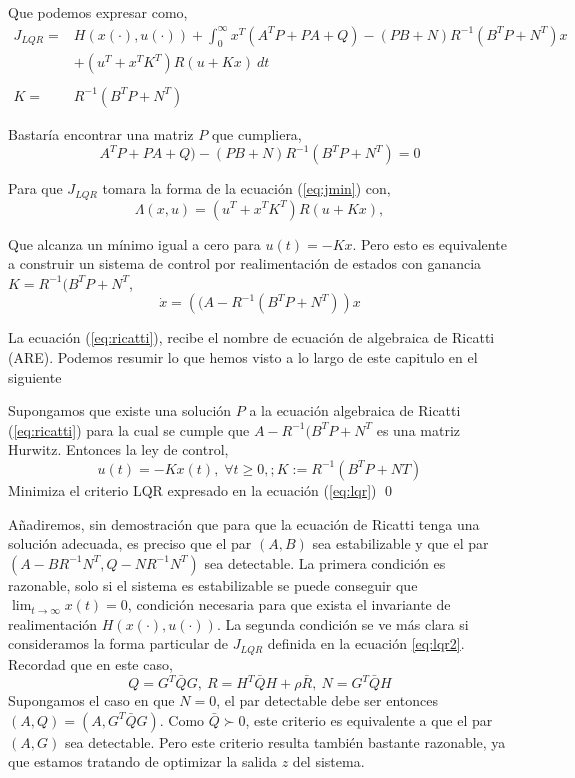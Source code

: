 Que podemos expresar como,
\begin{equation}
\begin{split}
J_{LQR}=&H\left(x(\cdot),u(\cdot)\right) + \int_0^{\infty}x^T(A^TP+PA+Q)-(PB+N)R^{-1}(B^TP+N^T)x\\
&+(u^T+x^TK^T)R(u+Kx)\ dt\\
\ \\
K =& R^{-1}(B^TP+N^T)
\end{split}
\end{equation}

Bastaría encontrar una matriz $P$ que cumpliera,
\begin{equation}\label{eq:ricatti}
A^TP+PA+Q)-(PB+N)R^{-1}(B^TP+N^T) = 0
\end{equation}

Para que $J_{LQR}$ tomara la forma de la ecuación (\ref{eq:jmin}) con,
\begin{equation*}
\Lambda(x,u) = (u^T+x^TK^T)R(u+Kx),
\end{equation*} 

Que alcanza un mínimo igual a cero para $u(t) = -Kx$.  Pero esto es equivalente a construir un sistema de control por realimentación de estados con ganancia $K = R^{-1}(B^TP+N^T$,
\begin{equation}
\dot x = \left((A-R^{-1}(B^TP+N^T)\right)x
\end{equation}

La ecuación (\ref{eq:ricatti}), recibe el nombre de ecuación de algebraica de Ricatti (ARE). Podemos resumir lo que hemos visto a lo largo de este capitulo en el siguiente 

\begin{theorem}
Supongamos que existe una solución $P$ a la ecuación algebraica de Ricatti (\ref{eq:ricatti}) para la cual se cumple que $A-R^{-1}(B^TP+N^T$ es una matriz Hurwitz. Entonces la ley de control,
\begin{equation*}
u(t) = -Kx(t),\; \forall t \geq 0,; K:=R^{-1}(B^TP+NT)
\end{equation*}
Minimiza el criterio LQR expresado en la ecuación (\ref{eq:lqr})
\qed
\end{theorem}

Añadiremos, sin demostración que para que la ecuación de Ricatti tenga una solución adecuada, es preciso que el par $(A,B)$ sea estabilizable y que el par $(A-BR^{-1}N^T,Q-NR^{-1}N^T)$ sea detectable. La primera condición es razonable, solo si el sistema es estabilizable se puede conseguir que $\lim_{t\rightarrow \infty} x(t)= 0$, condición necesaria para que exista el invariante de realimentación $H(x(\cdot),u(\cdot))$.  La segunda condición se ve más clara si consideramos la forma particular de $J_{LQR}$ definida en la ecuación \ref{eq:lqr2}. Recordad que en este caso,
\begin{equation*}
 Q = G^T\bar{Q}G,\ R = H^T\bar{Q}H + \rho\bar{R}, \ N = G^T\bar{Q}H 
\end{equation*}   
Supongamos el caso en que  $N = 0$, el par detectable debe ser entonces $(A,Q) = (A,G^T\bar{Q}G)$. Como $\bar{Q} \succ 0$, este criterio es equivalente a que el par $(A,G)$ sea detectable. Pero este criterio resulta también bastante razonable, ya que estamos tratando de optimizar la salida $z$ del sistema. 

